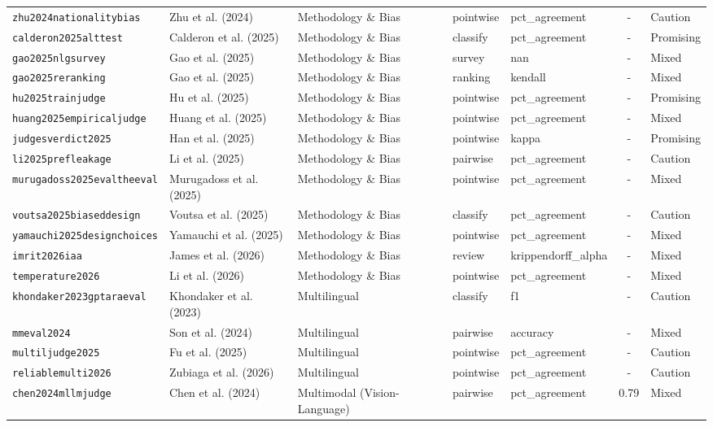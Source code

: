 \begin{longtable}{@{}l l l l l c l@{}}
\texttt{zhu2024nationalitybias} & Zhu et al. (2024) & Methodology \& Bias & pointwise & pct\_agreement & - & Caution \\
\texttt{calderon2025alttest} & Calderon et al. (2025) & Methodology \& Bias & classify & pct\_agreement & - & Promising \\
\texttt{gao2025nlgsurvey} & Gao et al. (2025) & Methodology \& Bias & survey & nan & - & Mixed \\
\texttt{gao2025reranking} & Gao et al. (2025) & Methodology \& Bias & ranking & kendall & - & Mixed \\
\texttt{hu2025trainjudge} & Hu et al. (2025) & Methodology \& Bias & pointwise & pct\_agreement & - & Promising \\
\texttt{huang2025empiricaljudge} & Huang et al. (2025) & Methodology \& Bias & pointwise & pct\_agreement & - & Mixed \\
\texttt{judgesverdict2025} & Han et al. (2025) & Methodology \& Bias & pointwise & kappa & - & Promising \\
\texttt{li2025prefleakage} & Li et al. (2025) & Methodology \& Bias & pairwise & pct\_agreement & - & Caution \\
\texttt{murugadoss2025evaltheeval} & Murugadoss et al. (2025) & Methodology \& Bias & pointwise & pct\_agreement & - & Mixed \\
\texttt{voutsa2025biaseddesign} & Voutsa et al. (2025) & Methodology \& Bias & classify & pct\_agreement & - & Caution \\
\texttt{yamauchi2025designchoices} & Yamauchi et al. (2025) & Methodology \& Bias & pointwise & pct\_agreement & - & Mixed \\
\texttt{imrit2026iaa} & James et al. (2026) & Methodology \& Bias & review & krippendorff\_alpha & - & Mixed \\
\texttt{temperature2026} & Li et al. (2026) & Methodology \& Bias & pointwise & pct\_agreement & - & Mixed \\
\texttt{khondaker2023gptaraeval} & Khondaker et al. (2023) & Multilingual & classify & f1 & - & Caution \\
\texttt{mmeval2024} & Son et al. (2024) & Multilingual & pairwise & accuracy & - & Mixed \\
\texttt{multiljudge2025} & Fu et al. (2025) & Multilingual & pointwise & pct\_agreement & - & Caution \\
\texttt{reliablemulti2026} & Zubiaga et al. (2026) & Multilingual & pointwise & pct\_agreement & - & Caution \\
\texttt{chen2024mllmjudge} & Chen et al. (2024) & Multimodal (Vision-Language) & pairwise & pct\_agreement & 0.79 & Mixed \\

\end{longtable}
